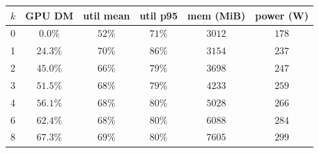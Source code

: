 \begin{tabular}{lccccc}
\toprule
$k$ & GPU DM & util mean & util p95 & mem (MiB) & power (W) \\
\midrule
0 & $0.0\%$ & $52\%$ & $71\%$ & $3012$ & $178$ \\
1 & $24.3\%$ & $70\%$ & $86\%$ & $3154$ & $237$ \\
2 & $45.0\%$ & $66\%$ & $79\%$ & $3698$ & $247$ \\
3 & $51.5\%$ & $68\%$ & $79\%$ & $4233$ & $259$ \\
4 & $56.1\%$ & $68\%$ & $80\%$ & $5028$ & $266$ \\
6 & $62.4\%$ & $68\%$ & $80\%$ & $6088$ & $284$ \\
8 & $67.3\%$ & $69\%$ & $80\%$ & $7605$ & $299$ \\
\bottomrule
\end{tabular}
